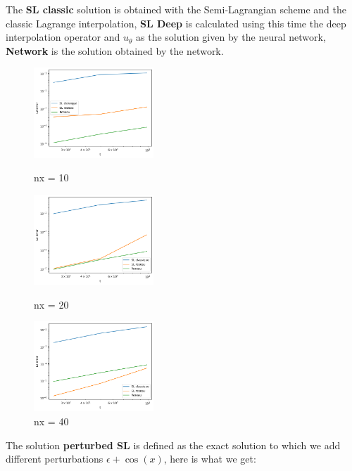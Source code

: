 \documentclass{article}
\begin{document}
The \textbf{SL classic} solution is obtained with the Semi-Lagrangian scheme and the classic Lagrange interpolation, \textbf{SL Deep} is calculated using this time the deep interpolation operator and $u_\theta $ as the solution given by the neural network, \textbf{Network} is the solution obtained by the network.\\

\begin{figure}[!h]
    \centering
    \includegraphics[width=0.4\textwidth]{images/i110.png}
    \caption{nx = 10}
    \includegraphics[width=0.4\textwidth]{images/i120.png}
    \caption{nx = 20}
    \includegraphics[width=0.4\textwidth]{images/i1.png}
    \caption{nx = 40}

\end{figure}
The solution \textbf{perturbed SL} is defined as the exact solution to which we add different perturbations $\epsilon + \cos(x)$, here is what we get:\\
\end{document}

